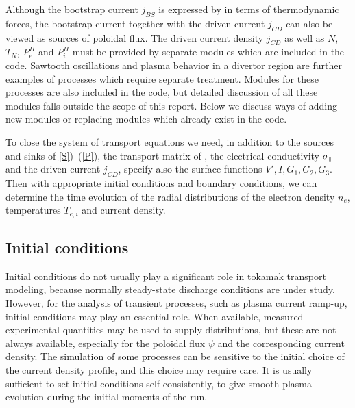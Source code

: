 Although the bootstrap current $j_{BS}$ is expressed by  in
terms of thermodynamic forces, the bootstrap current together with the
driven current $j_{CD}$ can also be viewed as sources of poloidal flux. 
The driven current density $j_{CD}$ as well as $N$, $T_N$, $P_e^H$ and
$P_i^H$ must be provided by separate modules which are included in the
code. 
Sawtooth oscillations and plasma behavior in a divertor region are
further examples of processes which require separate treatment. 
Modules for these processes are also included in the code, but
detailed discussion of all these modules falls outside the scope of this
report. 
Below we discuss ways of adding new modules or replacing modules which
already exist in the code.

To close the system of transport equations  we need, in
addition to the sources and sinks of \eqs\ref{S})--(\ref{P}), the
transport matrix of , the electrical conductivity
$\sigma_{\scriptscriptstyle\parallel}$ and the driven current $j_{CD}$, specify also the surface
functions $V',I,G_1,G_2,G_3$.
Then with appropriate initial conditions and boundary conditions, we can
determine the time evolution of the radial distributions of the electron
density $n_e$, temperatures $T_{e,i}$ and current density.

\subsection{Initial conditions}

Initial conditions do not usually play a significant role in tokamak
transport modeling, because normally steady-state discharge conditions
are under study. 
However, for the analysis of transient processes, such as plasma current
ramp-up, initial conditions may play an essential role. 
When available, measured experimental quantities may be used to supply
distributions, but these are not always available, especially for the
poloidal flux $\psi$ and the corresponding current density. 
The simulation of some processes can be sensitive to the initial choice
of the current density profile, and this choice may require care.
It is usually sufficient to set initial conditions self-consistently,
to give smooth plasma evolution during the initial moments of the run. 

